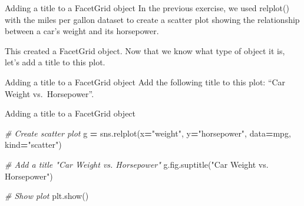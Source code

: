 \documentclass[
  ignorenonframetext,
]{beamer}
\newenvironment{Shaded}{\begin{snugshade}}{\end{snugshade}}
\newcommand{\CommentTok}[1]{\textcolor[rgb]{0.56,0.35,0.01}{\textit{#1}}}
\newcommand{\NormalTok}[1]{#1}
\newcommand{\OperatorTok}[1]{\textcolor[rgb]{0.81,0.36,0.00}{\textbf{#1}}}
\newcommand{\StringTok}[1]{\textcolor[rgb]{0.31,0.60,0.02}{#1}}
\begin{document}
\begin{frame}{Adding a title to a FacetGrid object}
\label{adding-a-title-to-a-facetgrid-object}
In the previous exercise, we used relplot() with the miles per gallon
dataset to create a scatter plot showing the relationship between a
car's weight and its horsepower.

This created a FacetGrid object. Now that we know what type of object it
is, let's add a title to this plot.
\end{frame}

\begin{frame}{Adding a title to a FacetGrid object}
\label{adding-a-title-to-a-facetgrid-object-1}
Add the following title to this plot: ``Car Weight vs.~Horsepower''.
\end{frame}

\begin{frame}[fragile]{Adding a title to a FacetGrid object}
\label{adding-a-title-to-a-facetgrid-object-2}

\begin{Shaded}
\begin{Highlighting}[]
\CommentTok{\# Create scatter plot}
\NormalTok{g }\OperatorTok{=}\NormalTok{ sns.relplot(x}\OperatorTok{=}\StringTok{"weight"}\NormalTok{, }
\NormalTok{                y}\OperatorTok{=}\StringTok{"horsepower"}\NormalTok{, }
\NormalTok{                data}\OperatorTok{=}\NormalTok{mpg,}
\NormalTok{                kind}\OperatorTok{=}\StringTok{"scatter"}\NormalTok{)}

\CommentTok{\# Add a title "Car Weight vs. Horsepower"}
\NormalTok{g.fig.suptitle(}\StringTok{"Car Weight vs. Horsepower"}\NormalTok{)}

\CommentTok{\# Show plot}
\NormalTok{plt.show()}
\end{Highlighting}
\end{Shaded}
\end{frame}
\end{document}
